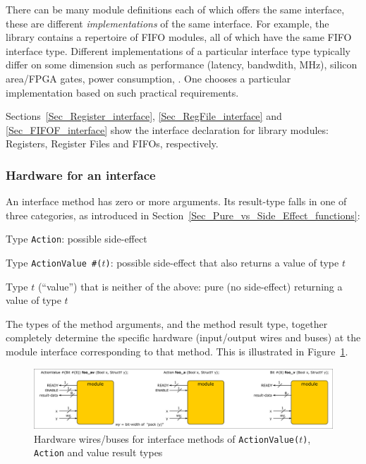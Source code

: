 There can be many module definitions each of which offers the same
interface, {\ie} these are different \emph{implementations} of the
same interface.  For example, the {\BSV} library contains a repertoire of
FIFO modules, all of which have the same FIFO interface type.
Different implementations of a particular interface type typically
differ on some dimension such as performance (latency, bandwdith,
MHz), silicon area/FPGA gates, power consumption, {\etc}.  One chooses
a particular implementation based on such practical requirements.

Sections~\ref{Sec_Register_interface}, \ref{Sec_RegFile_interface} and
\ref{Sec_FIFOF_interface} show the interface declaration for {\BSV}
library modules: Registers, Register Files and FIFOs, respectively.


\subsubsection{Hardware for an interface}

\label{Sec_Interface_HW}

An interface method has zero or more arguments.  Its result-type falls
in one of three categories, as introduced in
Section~\ref{Sec_Pure_vs_Side_Effect_functions}:
\begin{tightlist}

 \item Type {\tt Action}: possible side-effect

 \item Type {\tt ActionValue \#($t$)}: possible side-effect
       that also returns a value of type $t$

 \item Type $t$ (``value'') that is neither of the above: pure (no
       side-effect) returning a value of type $t$

\end{tightlist}

The types of the method arguments, and the method result type,
together completely determine the specific hardware (input/output
wires and buses) at the module interface corresponding to that method.
This is illustrated in Figure~\ref{Fig_Interface_Buses}.
\begin{figure}[htbp]
  \centerline{\includegraphics[width=6in,angle=0]{Figures/Fig_Interface_Buses}}
  \caption{\label{Fig_Interface_Buses}
           Hardware wires/buses for interface methods of {\tt ActionValue($t$)}, {\tt Action} and value result types}
\end{figure}


